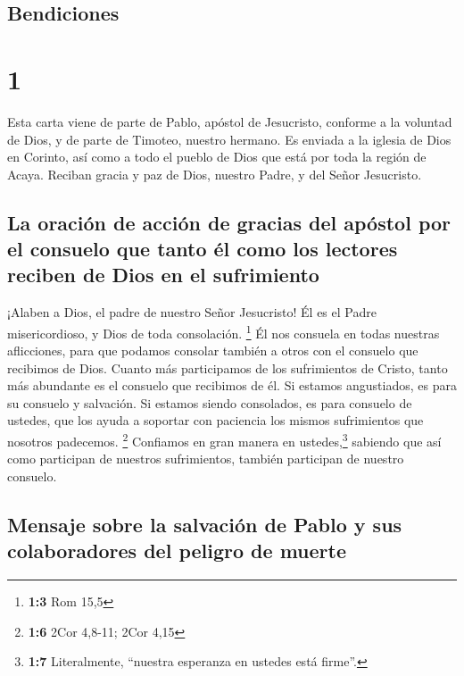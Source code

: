 \hypertarget{bendiciones}{%
\subsection{Bendiciones}\label{bendiciones}}

\hypertarget{section}{%
\section{1}\label{section}}

 Esta carta viene de parte de Pablo, apóstol de
Jesucristo, conforme a la voluntad de Dios, y de parte de Timoteo,
nuestro hermano. Es enviada a la iglesia de Dios en Corinto, así como a
todo el pueblo de Dios que está por toda la región de Acaya.
 Reciban gracia y paz de Dios, nuestro Padre, y del Señor
Jesucristo.

\hypertarget{la-oraciuxf3n-de-acciuxf3n-de-gracias-del-apuxf3stol-por-el-consuelo-que-tanto-uxe9l-como-los-lectores-reciben-de-dios-en-el-sufrimiento}{%
\subsection{La oración de acción de gracias del apóstol por el consuelo
que tanto él como los lectores reciben de Dios en el
sufrimiento}\label{la-oraciuxf3n-de-acciuxf3n-de-gracias-del-apuxf3stol-por-el-consuelo-que-tanto-uxe9l-como-los-lectores-reciben-de-dios-en-el-sufrimiento}}

 ¡Alaben a Dios, el padre de nuestro Señor Jesucristo! Él
es el Padre misericordioso, y Dios de toda consolación. \footnote{\textbf{1:3}
  Rom 15,5}  Él nos consuela en todas nuestras
aflicciones, para que podamos consolar también a otros con el consuelo
que recibimos de Dios.  Cuanto más participamos de los
sufrimientos de Cristo, tanto más abundante es el consuelo que recibimos
de él.  Si estamos angustiados, es para su consuelo y
salvación. Si estamos siendo consolados, es para consuelo de ustedes,
que los ayuda a soportar con paciencia los mismos sufrimientos que
nosotros padecemos. \footnote{\textbf{1:6} 2Cor 4,8-11; 2Cor 4,15}
 Confiamos en gran manera en ustedes,\footnote{\textbf{1:7}
  Literalmente, ``nuestra esperanza en ustedes está firme''.} sabiendo
que así como participan de nuestros sufrimientos, también participan de
nuestro consuelo.

\hypertarget{mensaje-sobre-la-salvaciuxf3n-de-pablo-y-sus-colaboradores-del-peligro-de-muerte}{%
\subsection{Mensaje sobre la salvación de Pablo y sus colaboradores del
peligro de
muerte}\label{mensaje-sobre-la-salvaciuxf3n-de-pablo-y-sus-colaboradores-del-peligro-de-muerte}}

